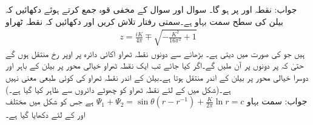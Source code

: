 جواب:\quad
نقطہ  اور  پر  ہو گا۔
\quad {}\quad
سوال  اور سوال  کے مخفی قوہ جمع کرتے ہوئے دکھائیں کہ بیلن کی سطح  سمت بہاو ہے۔سمتی رفتار تلاش کریں اور دکھائیں کہ نقطہ ٹھراو
\begin{align*}
z=\frac{iK}{4\pi}\mp \sqrt{-\frac{K^2}{16\pi^2}+1}
\end{align*}
ہیں جو  کی صورت میں  دیتی ہے۔ بڑھانے سے دونوں نقطہ ٹھراو اکائی دائرہ پر اوپر رخ منتقل ہوں گے  حتیٰ کہ  پر دونوں  پر آن ملیں گے۔اگر   کیا جائے تب ایک نقطہ ٹھراو خیالی محور پر بیلن کے باہر اور دوسرا خیالی محور پر بیلن کے اندر منتقل ہوتا ہے۔بیلن کے اندر نقطہ ٹھراو کی کوئی طبعی معنی نہیں ہے۔(شکل  میں  کے لئے نقطہ ٹھراو کو چھوٹے دائروں سے ظاہر کیا گیا ہے۔)\\
جواب:\quad
سمت بہاو 
$\Psi_1+\Psi_2=\sin\theta(r-r^{-1})+\tfrac{K}{2\pi}\ln r=c$
ہے جس کو شکل  میں مختلف  اور  کے لئے دکھایا گیا ہے۔
